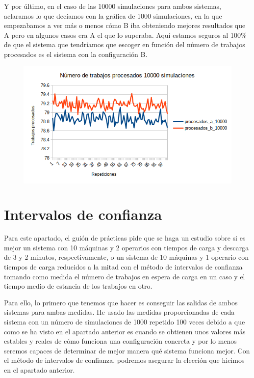 \documentclass[11pt,a4paper]{report}
\begin{document}
Y por último, en el caso de las 10000 simulaciones para ambos sistemas, aclaramos lo que decíamos con la gráfica de 1000 simulaciones, en la que empezabamos a ver más o menos cómo B iba obteniendo mejores resultados que A pero en algunos casos era A el que lo superaba. Aquí estamos seguros al 100\% de que el sistema que tendríamos que escoger en función del número de trabajos procesados es el sistema con la configuración B.

\begin{figure}[H]
\includegraphics[width=\textwidth]{img/cap-3/ttp_10000.png}
\caption{}
\label{}
\end{figure}
\newpage
\section{Intervalos de confianza}

Para este apartado, el guión de prácticas pide que se haga un estudio sobre si es mejor un sistema con 10 máquinas y 2 operarios con tiempos de carga y descarga de 3 y 2 minutos, respectivamente, o un sistema de 10 máquinas y 1 operario con tiempos de carga reducidos a la mitad con el método de intervalos de confianza tomando como medida el número de trabajos en espera de carga en un caso y el tiempo medio de estancia de los trabajos en otro.

Para ello, lo primero que tenemos que hacer es conseguir las salidas de ambos sistemas para ambas medidas. He usado las medidas proporcionadas de cada sistema con un número de simulaciones de 1000 repetido 100 veces debido a que como se ha visto en el apartado anterior es cuando se obtienen unos valores más estables y reales de cómo funciona una configuración concreta y por lo menos seremos capaces de determinar de mejor manera qué sistema funciona mejor. Con el método de intervalos de confianza, podremos asegurar la elección que hicimos en el apartado anterior.
\end{document}
